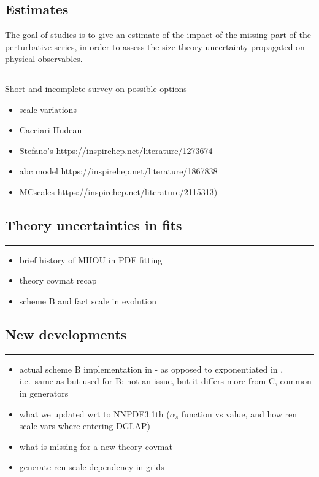 \subsection{Estimates}
\label{sec:pine/mhou-estimate}

The goal of \mhou studies is to give an estimate of the impact of the missing
part of the perturbative series, in order to assess the size theory uncertainty
propagated on physical observables.

\vspace*{20pt}
\noindent
\rule{\hsize}{1pt}

Short and incomplete survey on possible options
\begin{itemize}
	\item scale variations
	\item Cacciari-Hudeau
	\item  Stefano's https://inspirehep.net/literature/1273674
	\item abc model https://inspirehep.net/literature/1867838
	\item MCscales https://inspirehep.net/literature/2115313)
\end{itemize} 

\subsection{Theory uncertainties in \pdf fits}
\label{sec:pine/mhou-pdf}

\vspace*{20pt}
\noindent
\rule{\hsize}{1pt}

\begin{itemize}
	\item brief history of MHOU in PDF fitting
	\item theory covmat recap
	\item scheme B and fact scale in evolution
\end{itemize}

\subsection{New developments}
\label{sec:pine/mhou-pdf-new}

\vspace*{20pt}
\noindent
\rule{\hsize}{1pt}

\begin{itemize}
	\item actual scheme B implementation in \eko - as opposed to exponentiated
		in \apfel, i.e.\ same as \pegasus but used for B: not an issue, but it
		differs more from C, common in \mc generators
	\item what we updated wrt to NNPDF3.1th ($\alpha_s$ function vs value, and
		how ren scale vars where entering DGLAP)
	\item what is missing for a new theory covmat
	\item generate ren scale dependency in grids
\end{itemize}

